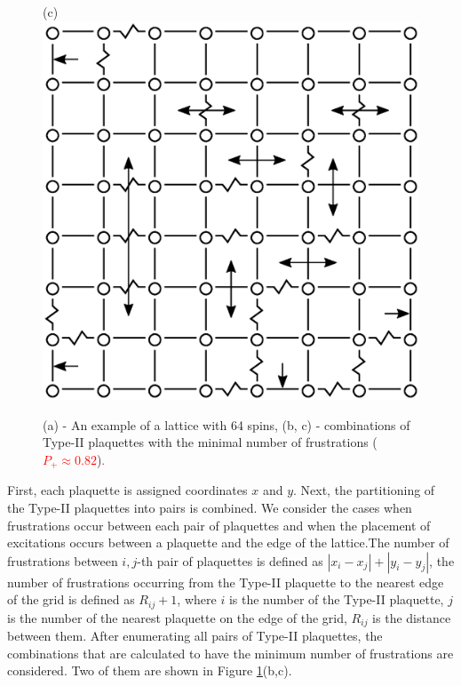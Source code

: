 \documentclass[preprint,12pt]{elsarticle}
\begin{document}
\begin{figure}[H]
\begin{minipage}[h]{0.3\linewidth}
		\end{minipage}
		\hspace{10pt}
		\begin{minipage}[h]{0.3\linewidth}
			\centering(c)
			\includegraphics[width=1\linewidth]{pictures/2PS_cell64_J72_5.eps}
		\end{minipage}
		\caption{(a) - An example of a lattice with 64 spins, (b, c) - combinations of Type-II plaquettes with the minimal number of frustrations (\textcolor{red}{  $P_+\approx0.82$})\textcolor{red}{.}}
		\label{fig:12PS_cell64_J72_5}
	\end{figure}
	
	
	First, each plaquette is assigned coordinates $x$ and $y$. Next, the partitioning of the Type-II plaquettes into pairs is combined. We consider the cases when frustrations occur between each pair of plaquettes and when the placement of excitations occurs between a plaquette and the edge of the lattice.The number of frustrations between $i,j$-th pair of plaquettes is defined as $\left|x_i-x_j\right|+\left|y_i-y_j\right|$, the number of frustrations occurring from the Type-II plaquette to the nearest edge of the grid is defined as $R_{ij}+1$, where $i$ is the number of the Type-II plaquette, $j$ is the number of the nearest plaquette on the edge of the grid, $R_{ij}$ is the distance between them. After enumerating all pairs of Type-II plaquettes, the combinations that are calculated to have the minimum number of frustrations are considered. Two of them are shown in Figure \ref{fig:12PS_cell64_J72_5}(b,c).
	
\end{document}
